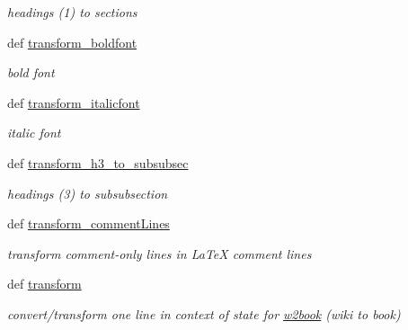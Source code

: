 \begin{DoxyCompactItemize}
\begin{DoxyCompactList}\small\item\em headings (1) to sections \end{DoxyCompactList}\item 
def \hyperlink{namespaceuicilibris_1_1transform2article_adb690b02bd00a079f3534b3c8bca96f5}{transform\-\_\-boldfont}
\begin{DoxyCompactList}\small\item\em bold font \end{DoxyCompactList}\item 
def \hyperlink{namespaceuicilibris_1_1transform2article_aeb70729282e28071468d4ccca53e8509}{transform\-\_\-italicfont}
\begin{DoxyCompactList}\small\item\em italic font \end{DoxyCompactList}\item 
def \hyperlink{namespaceuicilibris_1_1transform2article_a5e0a42c60e979ee65fbba5eca16a1d4e}{transform\-\_\-h3\-\_\-to\-\_\-subsubsec}
\begin{DoxyCompactList}\small\item\em headings (3) to subsubsection \end{DoxyCompactList}\item 
def \hyperlink{namespaceuicilibris_1_1transform2article_a367917f3e51f981b240fde0668a795b8}{transform\-\_\-comment\-Lines}
\begin{DoxyCompactList}\small\item\em transform comment-\/only lines in \-La\-Te\-X comment lines \end{DoxyCompactList}\item 
def \hyperlink{namespaceuicilibris_1_1transform2article_a9f02a5b65714762575914ad84f7fe488}{transform}
\begin{DoxyCompactList}\small\item\em convert/transform one line in context of state for \hyperlink{namespaceuicilibris_1_1w2book}{w2book} (wiki to book) \end{DoxyCompactList}\end{DoxyCompactItemize}


